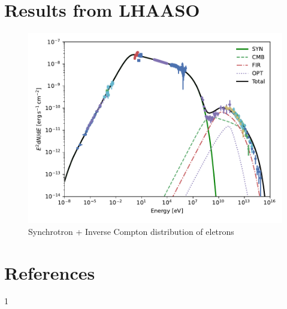 \documentclass[9pt, mathserif]{beamer}
\begin{document}
    \section{Results from LHAASO}
        \begin{frame}
            \begin{figure}[t]
                \centering
                \includegraphics[width=\linewidth]{SynIC-BestFitPar1.pdf}
                \caption{Synchrotron + Inverse Compton distribution of eletrons}
            \end{figure}
        \end{frame}




    \section{References}
        \begin{frame}
            \begin{thebibliography}{1}
                1
            \end{thebibliography}
        \end{frame}
\end{document}
